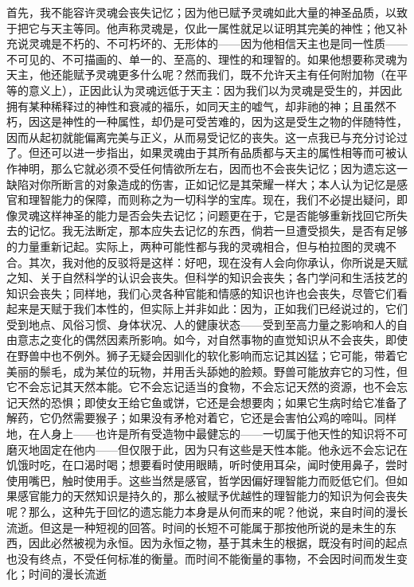 首先，我不能容许灵魂会丧失记忆；因为他已赋予灵魂如此大量的神圣品质，以致于把它与天主等同。他声称灵魂是，仅此一属性就足以证明其完美的神性；他又补充说灵魂是不朽的、不可朽坏的、无形体的——因为他相信天主也是同一性质——不可见的、不可描画的、单一的、至高的、理性的和理智的。如果他想要称灵魂为天主，他还能赋予灵魂更多什么呢？然而我们，既不允许天主有任何附加物（在平等的意义上），正因此认为灵魂远低于天主：因为我们以为灵魂是受生的，并因此拥有某种稀释过的神性和衰减的福乐，如同天主的嘘气，却非祂的神；且虽然不朽，因这是神性的一种属性，却仍是可受苦难的，因为这是受生之物的伴随特性，因而从起初就能偏离完美与正义，从而易受记忆的丧失。这一点我已与充分讨论过了。但还可以进一步指出，如果灵魂由于其所有品质都与天主的属性相等而可被认作神明，那么它就必须不受任何情欲所左右，因而也不会丧失记忆；因为遗忘这一缺陷对你所断言的对象造成的伤害，正如记忆是其荣耀一样大；本人认为记忆是感官和理智能力的保障，而则称之为一切科学的宝库。现在，我们不必提出疑问，即像灵魂这样神圣的能力是否会失去记忆；问题更在于，它是否能够重新找回它所失去的记忆。我无法断定，那本应失去记忆的东西，倘若一旦遭受损失，是否有足够的力量重新记起。实际上，两种可能性都与我的灵魂相合，但与柏拉图的灵魂不合。\newline{}\newline{}其次，我对他的反驳将是这样：好吧，现在没有人会向你承认，你所说是天赋之知、关于自然科学的认识会丧失。但科学的知识会丧失；各门学问和生活技艺的知识会丧失；同样地，我们心灵各种官能和情感的知识也许也会丧失，尽管它们看起来是天赋于我们本性的，但实际上并非如此：因为，正如我们已经说过的，它们受到地点、风俗习惯、身体状况、人的健康状态——受到至高力量之影响和人的自由意志之变化的偶然因素所影响。\newline{}\newline{}如今，对自然事物的直觉知识从不会丧失，即使在野兽中也不例外。狮子无疑会因驯化的软化影响而忘记其凶猛；它可能，带着它美丽的鬃毛，成为某位的玩物，并用舌头舔她的脸颊。野兽可能放弃它的习性，但它不会忘记其天然本能。它不会忘记适当的食物，不会忘记天然的资源，也不会忘记天然的恐惧；即使女王给它鱼或饼，它还是会想要肉；如果它生病时给它准备了解药，它仍然需要猴子；如果没有矛枪对着它，它还是会害怕公鸡的啼叫。同样地，在人身上——也许是所有受造物中最健忘的——一切属于他天性的知识将不可磨灭地固定在他内——但仅限于此，因为只有这些是天性本能。他永远不会忘记在饥饿时吃，在口渴时喝；想要看时使用眼睛，听时使用耳朵，闻时使用鼻子，尝时使用嘴巴，触时使用手。这些当然是感官，哲学因偏好理智能力而贬低它们。\newline{}\newline{}但如果感官能力的天然知识是持久的，那么被赋予优越性的理智能力的知识为何会丧失呢？那么，这种先于回忆的遗忘能力本身是从何而来的呢？他说，来自时间的漫长流逝。但这是一种短视的回答。时间的长短不可能属于那按他所说的是未生的东西，因此必然被视为永恒。因为永恒之物，基于其未生的根据，既没有时间的起点也没有终点，不受任何标准的衡量。而时间不能衡量的事物，不会因时间而发生变化；时间的漫长流逝